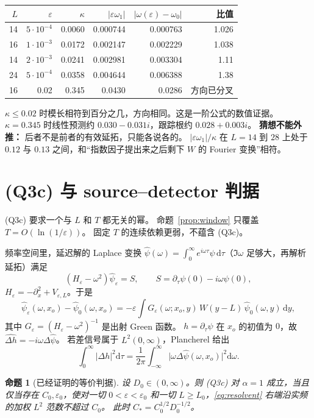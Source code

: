 \documentclass[11pt]{ctexart}
\newtheorem{proposition}[theorem]{命题}
\theoremstyle{definition}
\theoremstyle{remark}
\newcommand{\eps}{\varepsilon}
\newcommand{\rd}{\mathrm{d}}
\begin{document}
\begin{center}
\small
\begin{tabular}{rrrrrr}
\toprule
$L$ & $\eps$ & $\kappa$ & $|\eps\omega_1|$ & $|\omega(\eps)-\omega_0|$ & \mbox{比值}\tabularnewline
\midrule
14 & $5\cdot10^{-4}$ & 0.0060 & 0.000744 & 0.000763 & 1.026\tabularnewline
16 & $1\cdot10^{-3}$ & 0.0172 & 0.002147 & 0.002229 & 1.038\tabularnewline
14 & $2\cdot10^{-3}$ & 0.0241 & 0.002981 & 0.003304 & 1.11\tabularnewline
24 & $5\cdot10^{-4}$ & 0.0358 & 0.004644 & 0.006388 & 1.38\tabularnewline
16 & 0.02 & 0.345 & 0.0430 & 0.0286 & \mbox{方向已分叉}\tabularnewline
\bottomrule
\end{tabular}
\end{center}

$\kappa\le0.02$ 时模长相符到百分之几，方向相同。这是一阶公式的数值证据。
$\kappa=0.345$ 时线性预测约 $0.030-0.031i$，跟踪根约 $0.028+0.003i$。
\textbf{猜想不能外推：} 后者不是前者的有效延拓，只能各说各的。
$|\eps\omega_1|/\kappa$ 在 $L=14$ 到 $28$ 上处于 $0.12$ 与 $0.13$ 之间，和“指数因子提出来之后剩下 $W$ 的 Fourier 变换”相符。

\section{(Q3c) 与 source--detector 判据}
\label{sec:q3c}

(Q3c) 要求一个与 $L$ 和 $T$ 都无关的幂。
命题~\ref{prop:window} 只覆盖 $T=O(\ln(1/\eps))$。
固定 $T$ 的连续依赖更弱，不蕴含 (Q3c)。

频率空间里，延迟解的 Laplace 变换 $\hat\psi(\omega)=\int_0^\infty e^{i\omega\tau}\psi\,\rd\tau$（$\Im\omega$ 足够大，再解析延拓）满足
\[
(H_\eps-\omega^2)\hat\psi_\eps=S,\qquad
S=\partial_\tau\psi(0)-i\omega\psi(0),
\]
$H_\eps=-\partial_x^2+V_{\eps,L}$。于是
\begin{equation}
\label{eq:resolvent}
\hat\psi_\eps(\omega,x_o)-\hat\psi_0(\omega,x_o)
=-\eps\int G_\eps(\omega;x_o,y)\,W(y-L)\,\hat\psi_0(\omega,y)\,\rd y,
\end{equation}
其中 $G_\eps=(H_\eps-\omega^2)^{-1}$ 是出射 Green 函数。
$h=\partial_\tau\psi$ 在 $x_o$ 的初值为 $0$，故 $\widehat{\Delta h}=-i\omega\Delta\hat\psi$。
若差信号属于 $L^2(0,\infty)$，Plancherel 给出
\[
\int_0^\infty|\Delta h|^2\rd\tau
=\frac1{2\pi}\int_{-\infty}^\infty
\bigl|\omega\Delta\hat\psi(\omega,x_o)\bigr|^2\rd\omega.
\]

\begin{proposition}[已经证明的等价判据]
\label{prop:criterion}
设 $D_0\in(0,\infty)$。则 (Q3c) 对 $\alpha=1$ 成立，当且仅当存在 $C_0,\eps_0$，使对一切 $0<\eps<\eps_0$ 和一切 $L\ge L_0$，\eqref{eq:resolvent} 右端沿实频的加权 $L^2$ 范数不超过 $C_0$。
此时 $C_*=C_0^{1/2}D_0^{-1/2}$。
\end{proposition}
\end{document}
